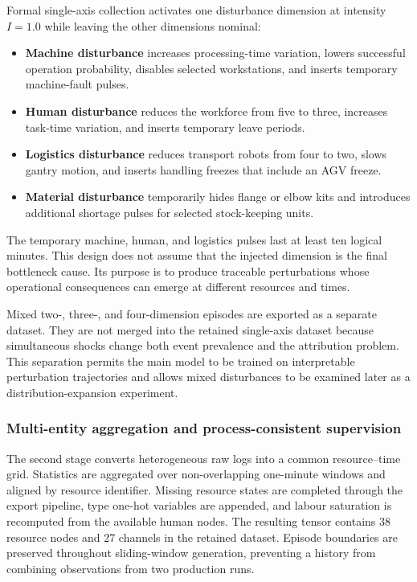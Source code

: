 \documentclass[a4paper,fleqn]{cas-dc}
\begin{document}
Formal single-axis collection activates one disturbance dimension at intensity $I=1.0$ while leaving the other dimensions nominal:
\begin{itemize}
 \item[$\bullet$] \textbf{Machine disturbance} increases processing-time variation, lowers successful operation probability, disables selected workstations, and inserts temporary machine-fault pulses.
 \item[$\bullet$] \textbf{Human disturbance} reduces the workforce from five to three, increases task-time variation, and inserts temporary leave periods.
 \item[$\bullet$] \textbf{Logistics disturbance} reduces transport robots from four to two, slows gantry motion, and inserts handling freezes that include an AGV freeze.
 \item[$\bullet$] \textbf{Material disturbance} temporarily hides flange or elbow kits and introduces additional shortage pulses for selected stock-keeping units.
\end{itemize}
The temporary machine, human, and logistics pulses last at least ten logical minutes. This design does not assume that the injected dimension is the final bottleneck cause. Its purpose is to produce traceable perturbations whose operational consequences can emerge at different resources and times.


Mixed two-, three-, and four-dimension episodes are exported as a separate dataset. They are not merged into the retained single-axis dataset because simultaneous shocks change both event prevalence and the attribution problem. This separation permits the main model to be trained on interpretable perturbation trajectories and allows mixed disturbances to be examined later as a distribution-expansion experiment.


\subsubsection{Multi-entity aggregation and process-consistent supervision}

The second stage converts heterogeneous raw logs into a common resource--time grid. Statistics are aggregated over non-overlapping one-minute windows and aligned by resource identifier. Missing resource states are completed through the export pipeline, type one-hot variables are appended, and labour saturation is recomputed from the available human nodes. The resulting tensor contains 38 resource nodes and 27 channels in the retained dataset. Episode boundaries are preserved throughout sliding-window generation, preventing a history from combining observations from two production runs.
\end{document}
